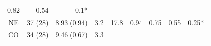 \begin{longtable}[]{@{}crrrrllrl@{}}
\begin{minipage}[t]{0.06\columnwidth}
0.82\strut
\end{minipage} & \begin{minipage}[t]{0.06\columnwidth}\raggedleft\strut
0.54\strut
\end{minipage} & \begin{minipage}[t]{0.07\columnwidth}\raggedright\strut
0.1*\strut
\end{minipage}\tabularnewline
\begin{minipage}[t]{0.12\columnwidth}\centering\strut
NE\strut
\end{minipage} & \begin{minipage}[t]{0.08\columnwidth}\raggedleft\strut
37 (28)\strut
\end{minipage} & \begin{minipage}[t]{0.13\columnwidth}\raggedleft\strut
8.93 (0.94)\strut
\end{minipage} & \begin{minipage}[t]{0.04\columnwidth}\raggedleft\strut
3.2\strut
\end{minipage} & \begin{minipage}[t]{0.05\columnwidth}\raggedleft\strut
17.8\strut
\end{minipage} & \begin{minipage}[t]{0.11\columnwidth}\raggedright\strut
0.94\strut
\end{minipage} & \begin{minipage}[t]{0.06\columnwidth}\raggedright\strut
0.75\strut
\end{minipage} & \begin{minipage}[t]{0.06\columnwidth}\raggedleft\strut
0.55\strut
\end{minipage} & \begin{minipage}[t]{0.07\columnwidth}\raggedright\strut
0.25*\strut
\end{minipage}\tabularnewline
\begin{minipage}[t]{0.12\columnwidth}\centering\strut
CO\strut
\end{minipage} & \begin{minipage}[t]{0.08\columnwidth}\raggedleft\strut
34 (28)\strut
\end{minipage} & \begin{minipage}[t]{0.13\columnwidth}\raggedleft\strut
9.46 (0.67)\strut
\end{minipage} & \begin{minipage}[t]{0.04\columnwidth}\raggedleft\strut
3.3\strut
\end{minipage} & \begin{minipage}[t]{0.05\columnwidth}\raggedleft\strut

\end{minipage}
\end{longtable}
